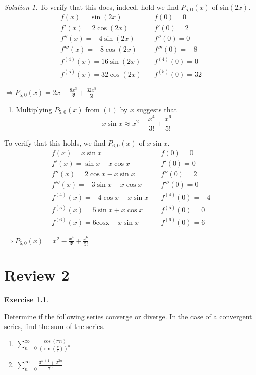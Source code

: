 \documentclass[
]{book}
\providecommand{\tightlist}{%
  \setlength{\itemsep}{0pt}\setlength{\parskip}{0pt}}
\theoremstyle{definition}
\theoremstyle{definition}
\theoremstyle{definition}
\newtheorem{exercise}{Exercise}[chapter]
\theoremstyle{definition}
\theoremstyle{remark}
\newtheorem*{solution}{Solution}
\begin{document}
\begin{solution}
To verify that this does, indeed, hold we find \(P_{5,0}(x)\) of sin\((2x)\).
\begin{align*} 
 f(x)=\sin (2x) & \quad f(0)=0\\
 f'(x)=2\cos (2x) & \quad f'(0)= 2\\
 f''(x)=-4\sin (2x) & \quad f''(0)=0\\
 f'''(x)=-8\cos (2x) & \quad f'''(0)=-8\\
 f^{(4)}(x)=16\sin (2x) & \quad f^{(4)}(0)=0\\
f^{(5)}(x)=32\cos (2x) & \quad f^{(5)}(0)=32
\end{align*}

\(\displaystyle\Rightarrow P_{5,0}(x)=2x-\frac{8x^3}{3!}+\frac{32x^5}{5!}\)

\begin{enumerate}
\def\labelenumi{\arabic{enumi}.}
\setcounter{enumi}{3}
\tightlist
\item
  Multiplying \(P_{5,0}(x)\) from \((1)\) by \(x\) suggests that
  \[x\sin x\approx x^2-\frac{x^4}{3!}+\frac{x^6}{5!}\]
\end{enumerate}

To verify that this holds, we find \(P_{6,0}(x)\) of \(x\sin x\).
\begin{align*} 
 f(x)=x\sin x & \quad f(0)=0\\
 f'(x)=\sin x +x\cos x & \quad f'(0)=0\\
 f''(x)=2\cos x-x\sin x & \quad f''(0)=2\\
 f'''(x)=-3\sin x-x\cos x & \quad f'''(0)=0\\
 f^{(4)}(x)=-4\cos x+x\sin x & \quad f^{(4)}(0)=-4\\
 f^{(5)}(x)=5\sin x+x\cos x & \quad f^{(5)}(0)=0\\
 f^{(6)}(x)=6\mathrm{cosx}-x\sin x& \quad f^{(6)}(0)=6
\end{align*}

\(\displaystyle\Rightarrow P_{6,0}(x)=x^2-\frac{x^4}{3!}+\frac{x^6}{5!}\)

\end{solution}

\hypertarget{lec-36}{%
\chapter{Review 2}\label{lec-36}}

\begin{exercise}
\protect\hypertarget{exr:unlabeled-div-279}{}\label{exr:unlabeled-div-279}

Determine if the following series converge or diverge. In the case of a convergent series, find the sum of the series.

\begin{enumerate}
\def\labelenumi{\arabic{enumi}.}
\tightlist
\item
  \(\sum_{n=0}^{\infty} \frac{\cos{(\pi n)}}{(\sin{\left(\frac{\pi}{3}\right)})^n}\)
\item
  \(\displaystyle \sum_{n=0}^{\infty} \frac{3^{n+1}+2^{2n}}{7^n}\)
\end{enumerate}

\end{exercise}
\end{document}
